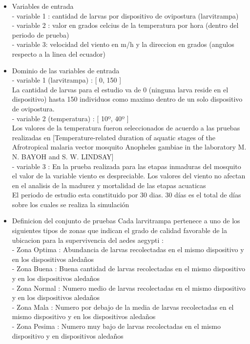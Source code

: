 \documentclass[a4paper]{article}
\begin{document}
\begin{itemize}
\item Variables de entrada \\
- variable 1 : cantidad de larvas por dispositivo de ovipostura (larvitrampa) \\
- variable 2 : valor en grados celcius de la temperatura por hora (dentro del periodo de prueba)\\
- variable 3: velocidad del viento en m/h y la direccion en grados (angulos respecto
a la linea del ecuador)\\

\item Dominio de las variables de entrada\\
- variable 1 (larvitrampa) : [ 0, 150 ]\\
La cantidad de larvas para el estudio va de 0 (ninguna larva reside en el 
dispositivo) hasta 150 individuos como maximo dentro de un solo dispositivo
de ovipostura.\\

- variable 2 (temperatura) :  [ 10º, 40º ]\\
Los valores de la temperatura fueron seleccionados de acuerdo a las pruebas realizadas en
[Temperature-related duration of aquatic stages of the Afrotropical 
malaria vector mosquito Anopheles gambiae in the laboratory M. N. BAYOH 
and S. W. LINDSAY]\\

- variable 3 : En la prueba realizada para las etapas inmaduras del 
mosquito el valor de la variable viento es despreciable. Los valores 
del viento no afectan en el analisis de la madurez y mortalidad 
de las etapas acuaticas\\

El periodo de estudio esta constituido por 30 dias. 30 días es el total
de días sobre los cuales se realiza la simulación \\

\item Definicion del conjunto de pruebas
Cada larvitrampa pertenece a uno de los siguientes tipos de zonas que 
indican el grado de calidad favorable de la ubicacion para la supervivencia
del aedes aegypti :\\

- Zona Optima : Abundancia de larvas recolectadas en el mismo dispositivo
y en los dispositivos aledaños \\
- Zona Buena : Buena cantidad de larvas recolectadas en el mismo dispositivo
y en los dispositivos aledaños \\
- Zona Normal : Numero medio de larvas recolectadas en el mismo dispositivo
y en los dispositivos aledaños \\
- Zona Mala : Numero por debajo de la media de larvas recolectadas en 
el mismo dispositivo y en los dispositivos aledaños \\
- Zona Pesima : Numero muy bajo de larvas recolectadas en el mismo dispositivo
y en dispositivos aledaños \\



\end{itemize}
\end{document}
